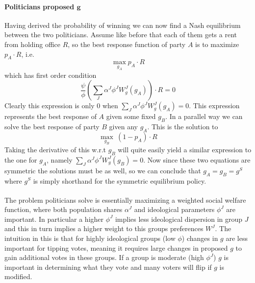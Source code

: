 \paragraph{Politicians proposed $\bm{g}$} Having derived the probability of winning we can now find a Nash equilibrium between the two politicians. Assume like before that each of them gets a rent from holding office $R$, so the best response function of party $A$ is to maximize $p_A \cdot R$, i.e. 
\begin{equation}
    \max_{g_A} p_A \cdot R
\end{equation}
which has first order condition 
\begin{equation}
    \frac{\psi}{\phi} \left(
    \sum_J \alpha^J 
        \phi^J W^J_g(g_A) 
    \right) \cdot R = 0
\end{equation}
Clearly this expression is only 0 when $\sum_J \alpha^J 
\phi^J W^J_g(g_A)=0$. This expression represents the best response of $A$ given some fixed $g_B$. In a parallel way we can solve the best response of party $B$ given any $g_A$. This is the solution to 
\begin{equation}
    \max_{g_B} \ (1-p_A) \cdot R
\end{equation}
Taking the derivative of this w.r.t $g_B$ will quite easily yield a similar expression to the one for $g_A$, namely $\sum_J \alpha^J 
\phi^J W^J_g(g_B)=0$. Now since these two equations are symmetric the solutions must be as well, so we can conclude that $g_A = g_B = g^S$ where $g^S$ is simply shorthand for the symmetric equilibrium policy. 
\\ \\ 
The problem politicians solve is essentially maximizing a weighted social welfare function, where both population shares $\alpha^J$ and ideological parameters $\phi^J$ are important. In particular a higher $\phi^J$ implies less ideological dispersion in group $J$ and this in turn implies a higher weight to this groups preferences $W^J$. The intuition in this is that for highly ideological groups (low $\phi$) changes in $g$ are less important for tipping votes, meaning it requires large changes in proposed $g$ to gain additional votes in these groups. If a group is moderate (high $\phi^J$) $g$ is important in determining what they vote and many voters will flip if $g$ is modified. 

